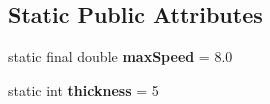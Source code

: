 \subsection*{Static Public Attributes}
\begin{DoxyCompactItemize}
\item 
\hypertarget{classbrick_breaker_1_1_racket_a08c1b8b4b30224b78b854b11cfbb6710}{
static final double {\bfseries maxSpeed} = 8.0}
\label{classbrick_breaker_1_1_racket_a08c1b8b4b30224b78b854b11cfbb6710}

\item 
\hypertarget{classbrick_breaker_1_1_racket_aed61315731a5be300989a390f009abd8}{
static int {\bfseries thickness} = 5}
\label{classbrick_breaker_1_1_racket_aed61315731a5be300989a390f009abd8}

\end{DoxyCompactItemize}
